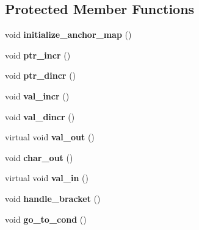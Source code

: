\subsection*{Protected Member Functions}
\begin{DoxyCompactItemize}
\item 
\mbox{\label{classVirtualMachine_a00fd4c9a26c49fbbc44e20029e2a4b5a}} 
void {\bfseries initialize\+\_\+anchor\+\_\+map} ()
\item 
\mbox{\label{classVirtualMachine_a831099c5103644994409bfb05158fcfa}} 
void {\bfseries ptr\+\_\+incr} ()
\item 
\mbox{\label{classVirtualMachine_a3337809db225885a4a767ab9a4e827be}} 
void {\bfseries ptr\+\_\+dincr} ()
\item 
\mbox{\label{classVirtualMachine_a39405fbc2b37978eb0caaf1cf7822c81}} 
void {\bfseries val\+\_\+incr} ()
\item 
\mbox{\label{classVirtualMachine_a4ececf3e5748ecc7dd08ba0bcf16708b}} 
void {\bfseries val\+\_\+dincr} ()
\item 
\mbox{\label{classVirtualMachine_ac77e5ad35f59aaac531a50fb050088be}} 
virtual void {\bfseries val\+\_\+out} ()
\item 
\mbox{\label{classVirtualMachine_a4c4d2727fab7e225f1bbc4bcf179334a}} 
void {\bfseries char\+\_\+out} ()
\item 
\mbox{\label{classVirtualMachine_ae48e3658153af738a27a7a1b51dfa824}} 
virtual void {\bfseries val\+\_\+in} ()
\item 
\mbox{\label{classVirtualMachine_a10bacaf18d480f8dd6b3965b1e5bdf54}} 
void {\bfseries handle\+\_\+bracket} ()
\item 
\mbox{\label{classVirtualMachine_af90bdd5633e01c2f3bc29bd5899dc059}} 
void {\bfseries go\+\_\+to\+\_\+cond} ()
\item 
\mbox{\label{classVirtualMachine_a8cef064caf26cd37e8f251fe872e0b3d}} 

\end{DoxyCompactItemize}
